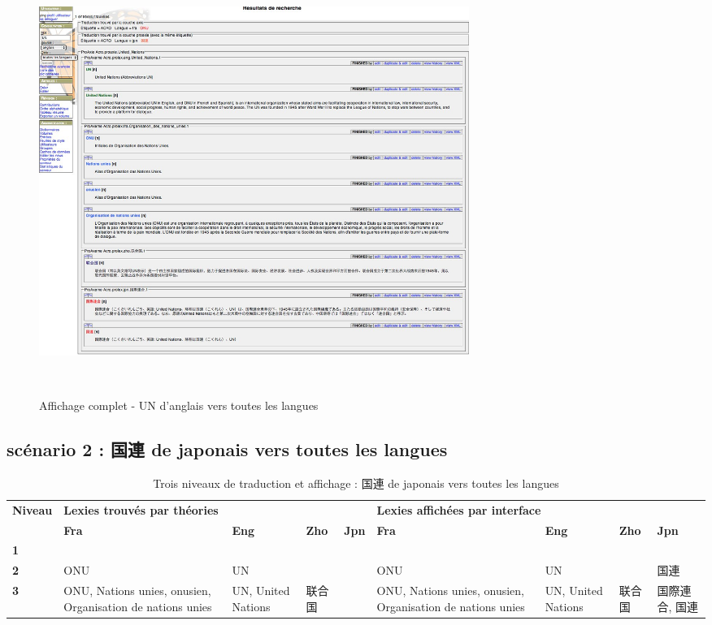 \documentclass[10pt,a4paper,twoside]{article}
\begin{document}
\begin{itemize}
\begin{figure}[htbp] 
\begin{center} 
\includegraphics[width=14cm]{images/scenario1-2.jpg}
\end{center} 
\caption{Affichage complet - UN d'anglais vers toutes les langues} \label{image} \
\end{figure}

\subsection{scénario 2 :  国連 de japonais vers toutes les langues}

\begin{table}[!h]
\centering
	\begin{tabular}{|p{1cm}|p{1.8cm}|p{1cm}|p{1cm}|p{0.5cm}|p{1.8cm}|p{1cm}|p{1cm}|p{1cm}|}
	\hline
	\textbf{Niveau} & \multicolumn{4}{l|}{\textbf{ Lexies trouvés par théories}}&\multicolumn{4}{l|}{\textbf{Lexies affichées par interface}} \\
	\cline{2-9}
	&\textbf{Fra} & \textbf{Eng} & \textbf{Zho} & \textbf{Jpn} & \textbf{Fra} & \textbf{Eng}  & \textbf{Zho} & \textbf{Jpn} \\
	\hline
	\textbf{1} &  &  &  &  &  &  &  &   \\
 	\hline
	\textbf{2} & ONU & UN &  & & ONU & UN &  &国連 \\
	\hline
	\textbf{3} & \raggedright ONU, Nations unies, onusien, Organisation de nations unies & \raggedright UN, United Nations & \raggedright 联合国 & & \raggedright ONU, Nations unies, onusien, Organisation de nations unies  & \raggedright UN, United Nations &  \raggedright 联合国 & 国際連合, 国連 \\
	\hline
	\end{tabular}
\caption{Trois niveaux de traduction et affichage : 国連 de japonais vers toutes les langues}\label{table}
\end{table}


\end{itemize}
\end{document}
